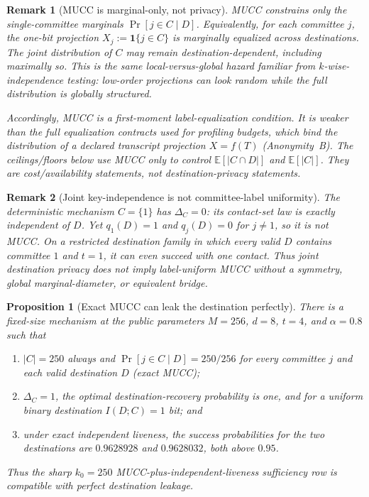 \documentclass[11pt]{article}
\newtheorem{proposition}{Proposition}
\newtheorem{remark}{Remark}
\newcommand{\E}{\mathbb{E}}
\newcommand{\one}{\mathbf{1}}
\begin{document}
\begin{remark}[MUCC is marginal-only, not privacy]
MUCC constrains only the \emph{single-committee} marginals $\Pr[j\in C\mid D]$.
Equivalently, for each committee $j$, the one-bit projection $X_j:=\one\{j\in C\}$ is marginally equalized across destinations.
The \emph{joint} distribution of $C$ may remain destination-dependent, including maximally so.  This is the same local-versus-global hazard familiar from $k$-wise-independence testing: low-order projections can look random while the full distribution is globally structured.\cite{alon2007kwise}

Accordingly, MUCC is a \emph{first-moment label-equalization condition}.  It is weaker than the full equalization contracts used for profiling budgets, which bind the distribution of a declared transcript projection $X=f(T)$ (Anonymity~B).\cite{series:profiling}  The ceilings/floors below use MUCC only to control $\E[|C\cap D|]$ and $\E[|C|]$.  They are cost/availability statements, not destination-privacy statements.
\end{remark}

\begin{remark}[Joint key-independence is not committee-label uniformity]
\label{rem:key-independent-not-mucc}
The deterministic mechanism $C=\{1\}$ has $\Delta_C=0$: its contact-set law is exactly independent of $D$.  Yet $q_1(D)=1$ and $q_j(D)=0$ for $j\ne1$, so it is not MUCC.  On a restricted destination family in which every valid $D$ contains committee $1$ and $t=1$, it can even succeed with one contact.  Thus joint destination privacy does not imply label-uniform MUCC without a symmetry, global marginal-diameter, or equivalent bridge.
\end{remark}

\begin{proposition}[Exact MUCC can leak the destination perfectly]
\label{prop:mucc-perfect-leakage}
There is a fixed-size mechanism at the public parameters $M=256$, $d=8$, $t=4$, and $\alpha=0.8$ such that
\begin{enumerate}[label=(\roman*),leftmargin=*]
\item $|C|=250$ always and $\Pr[j\in C\mid D]=250/256$ for every committee $j$ and each valid destination $D$ (exact MUCC);
\item $\Delta_C=1$, the optimal destination-recovery probability is one, and for a uniform binary destination $I(D;C)=1$ bit; and
\item under exact independent liveness, the success probabilities for the two destinations are $0.9628928$ and $0.9628032$, both above $0.95$.
\end{enumerate}
Thus the sharp $k_0=250$ MUCC-plus-independent-liveness sufficiency row is compatible with perfect destination leakage.
\end{proposition}
\end{document}

